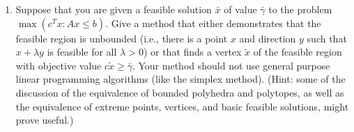 \documentclass[11pt]{article}
\begin{document}
\begin{enumerate}
\item Suppose that you are given a feasible solution $\bar x$ of value
$\bar \gamma$ to the problem $\max (c^T x: A x \le b)$. Give a method that either demonstrates that the feasible
region is unbounded (i.e., there is a point $x$ and direction $y$ such that
$x+\lambda y$ is feasible for all $\lambda >0$)
or that finds a vertex $\tilde x$ of the feasible region with objective
value $c \tilde x \ge \bar \gamma$. Your method should not use general
purpose linear programming algorithms (like the simplex method).
(Hint: some of the discussion of the equivalence of bounded polyhedra and polytopes, as well as the equivalence of
extreme points, vertices, and basic feasible solutions, might
prove useful.)

\end{enumerate}
\end{document}

